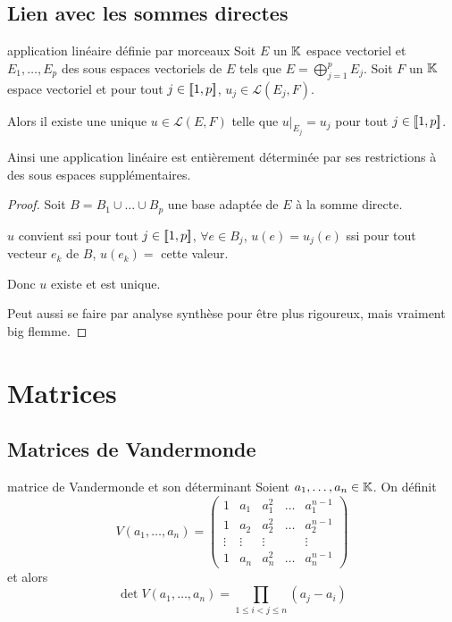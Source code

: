 \subsection{Lien avec les sommes directes}

\begin{theoreme}{application linéaire définie par morceaux}{}
    Soit $E$ un $\mathbb{K}$ espace vectoriel et $E_1, \dots, E_p$ des sous espaces vectoriels de $E$ tels que 
    $E = \bigoplus_{j=1}^p E_j$. Soit $F$ un $\mathbb{K}$ espace vectoriel et pour tout $j \in [\![1, p]\!]$,
    $u_j \in \mathscr L(E_j, F)$.

    Alors il existe une unique $u \in \mathscr L(E, F)$ telle que 
    $u|_{E_j} = u_j$ pour tout $j \in [\![1, p]\!]$.

    Ainsi une application linéaire est entièrement déterminée par ses restrictions à 
    des sous espaces supplémentaires.
\end{theoreme}

\begin{proof}
    Soit $B = B_1 \cup \dots \cup B_p$ une base adaptée de $E$ à la somme directe.

    $u$ convient ssi pour tout $j \in [\![1, p]\!]$, $\forall e \in B_j$, $u(e) = u_j(e)$ 
    ssi pour tout vecteur $e_k$ de $B$, $u(e_k) = $ cette valeur. 

    Donc $u$ existe et est unique. 

    Peut aussi se faire par analyse synthèse pour être plus rigoureux, mais vraiment 
    big flemme. 
\end{proof}


\section{Matrices }
\subsection{Matrices de Vandermonde}

\begin{definition}{matrice de Vandermonde et son déterminant}{}
    Soient $a_1, \dots, a_n \in \mathbb{K}$. On définit 
    $$ V (a_1, \dots, a_n) = \begin{pmatrix}
        1 & a_1 & a_1^2 & \dots & a_1^{n-1} \\
        1 & a_2 & a_2^2 & \dots & a_2^{n-1} \\
        \vdots & \vdots & \vdots & & \vdots \\
        1 & a_n & a_n^2 & \dots & a_n^{n-1}
    \end{pmatrix}$$ et alors 
    $$ \det V(a_1, \dots, a_n) = \prod_{1 \leqslant i < j \leqslant n} (a_j - a_i) $$
\end{definition}

